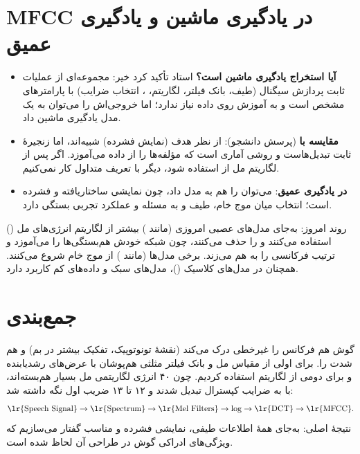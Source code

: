\section{MFCC در یادگیری ماشین و یادگیری عمیق}

\begin{itemize}
  \item \textbf{آیا استخراج  یادگیری ماشین است؟} استاد تأکید کرد خیر: مجموعه‌ای از عملیات ثابت پردازش سیگنال (طیف، بانک فیلتر، لگاریتم، ، انتخاب ضرایب) با پارامترهای مشخص است و به آموزش روی داده نیاز ندارد؛ اما خروجی‌اش را می‌توان به یک مدل یادگیری ماشین داد.
  \item \textbf{مقایسه با } (پرسش دانشجو): از نظر هدف (نمایش فشرده) شبیه‌اند، اما  زنجیرهٔ ثابت تبدیل‌هاست و  روشی آماری است که مؤلفه‌ها را از داده می‌آموزد. اگر پس از لگاریتم مل از  استفاده شود، دیگر با تعریف متداول  کار نمی‌کنیم.
  \item \textbf{در یادگیری عمیق}: می‌توان  را هم به مدل داد، چون نمایشی ساختاریافته و فشرده است؛ انتخاب میان موج خام، طیف و  به مسئله و عملکرد تجربی بستگی دارد.
\end{itemize}

\begin{correctionbox}{روند امروز:  به‌جای }
مدل‌های عصبی امروزی (مانند ) بیشتر از لگاریتم انرژی‌های مل () استفاده می‌کنند و  را حذف می‌کنند، چون شبکه خودش هم‌بستگی‌ها را می‌آموزد و  ترتیب فرکانسی را به هم می‌زند. برخی مدل‌ها (مانند ) از موج خام شروع می‌کنند.  همچنان در مدل‌های کلاسیک ()، مدل‌های سبک و داده‌های کم کاربرد دارد.
\end{correctionbox}

\section{جمع‌بندی}

گوش هم فرکانس را غیرخطی درک می‌کند (نقشهٔ تونوتوپیک، تفکیک بیشتر در بم) و هم شدت را. برای اولی از مقیاس مل و بانک فیلتر مثلثی هم‌پوشان با عرض‌های رشدیابنده و برای دومی از لگاریتم استفاده کردیم. چون ۴۰ انرژی لگاریتمی مل بسیار هم‌بسته‌اند، با  به ضرایب کپسترال تبدیل شدند و ۱۲ تا ۱۳ ضریب اول نگه داشته شد:
\[
\text{\lr{Speech Signal}}\to\text{\lr{Spectrum}}\to\text{\lr{Mel Filters}}\to\log\to\text{\lr{DCT}}\to\text{\lr{MFCC}} .
\]
نتیجهٔ اصلی: به‌جای همهٔ اطلاعات طیفی، نمایشی فشرده و مناسب گفتار می‌سازیم که ویژگی‌های ادراکی گوش در طراحی آن لحاظ شده است.

